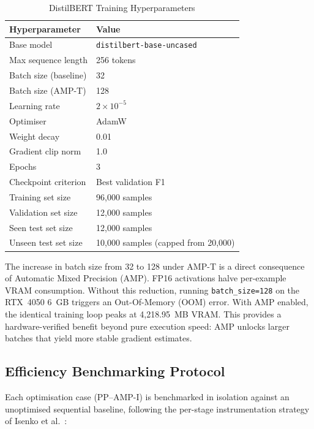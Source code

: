 \documentclass[conference]{IEEEtran}
\begin{document}
\begin{table}[t]
\caption{DistilBERT Training Hyperparameters}
\label{tab:hyperparams}
\begin{center}
\small
\begin{tabular}{ll}
\toprule
\textbf{Hyperparameter} & \textbf{Value}\\
\midrule
Base model             & \texttt{distilbert-base-uncased}\\
Max sequence length    & 256 tokens\\
Batch size (baseline)  & 32\\
Batch size (AMP-T)   & 128\\
Learning rate          & $2\times10^{-5}$\\
Optimiser              & AdamW\\
Weight decay           & 0.01\\
Gradient clip norm     & 1.0\\
Epochs                 & 3\\
Checkpoint criterion   & Best validation F1\\
Training set size      & 96,000 samples\\
Validation set size    & 12,000 samples\\
Seen test set size     & 12,000 samples\\
Unseen test set size   & 10,000 samples (capped from 20,000)\\
\bottomrule
\end{tabular}
\end{center}
\end{table}

The increase in batch size from 32 to 128 under AMP-T is a direct consequence
of Automatic Mixed Precision (AMP). FP16 activations halve per-example VRAM
consumption. Without this reduction, running \texttt{batch\_size=128} on the
RTX~4050 6~GB triggers an Out-Of-Memory (OOM) error. With AMP enabled, the
identical training loop peaks at 4,218.95~MB VRAM. This provides a
hardware-verified benefit beyond pure execution speed: AMP unlocks larger
batches that yield more stable gradient estimates.

\subsection{Efficiency Benchmarking Protocol}

Each optimisation case (PP--AMP-I) is benchmarked in isolation against an
unoptimised sequential baseline, following the per-stage instrumentation
strategy of Isenko et al.~\cite{isenko2022}:
\end{document}
